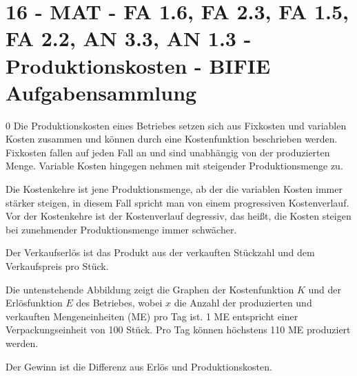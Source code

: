\section{16 - MAT - FA 1.6, FA 2.3, FA 1.5, FA 2.2, AN 3.3, AN 1.3 - Produktionskosten - BIFIE Aufgabensammlung}

\begin{langesbeispiel} \item[0] %
				Die Produktionskosten eines Betriebes setzen sich aus Fixkosten und variablen Kosten zusammen und können durch eine Kostenfunktion beschrieben werden. Fixkosten fallen auf jeden Fall an und sind unabhängig von der produzierten Menge. Variable Kosten hingegen nehmen mit steigender Produktionsmenge zu.
				
Die Kostenkehre ist jene Produktionsmenge, ab der die variablen Kosten immer stärker steigen, in diesem Fall spricht man von einem progressiven Kostenverlauf. Vor der Kostenkehre ist der Kostenverlauf degressiv, das heißt, die Kosten steigen bei zunehmender Produktionsmenge immer schwächer.
 
Der Verkaufserlös ist das Produkt aus der verkauften Stückzahl und dem Verkaufspreis pro Stück.

Die untenstehende Abbildung zeigt die Graphen der Kostenfunktion $K$ und der Erlösfunktion $E$ des Betriebes, wobei $x$ die Anzahl der produzierten und verkauften Mengeneinheiten (ME) pro Tag ist. 1 ME entspricht einer Verpackungseinheit von 100 Stück. Pro Tag können höchstens 110 ME produziert werden.

Der Gewinn ist die Differenz aus Erlös und Produktionskosten.\leer


\end{langesbeispiel}
